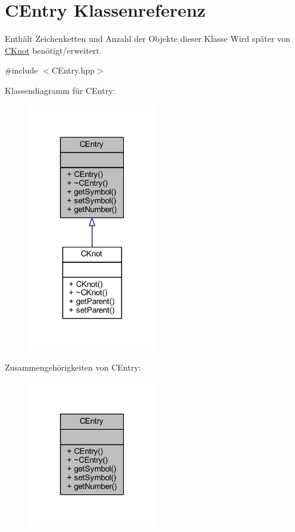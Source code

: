 \hypertarget{class_c_entry}{}\section{C\+Entry Klassenreferenz}
\label{class_c_entry}


Enthält Zeichenketten und Anzahl der Objekte dieser Klasse Wird später von \hyperlink{class_c_knot}{C\+Knot} benötigt/erweitert.  




{\ttfamily \#include $<$C\+Entry.\+hpp$>$}



Klassendiagramm für C\+Entry\+:
\nopagebreak
\begin{figure}[H]
\begin{center}
\leavevmode
\includegraphics[width=159pt]{class_c_entry__inherit__graph}
\end{center}
\end{figure}


Zusammengehörigkeiten von C\+Entry\+:
\nopagebreak
\begin{figure}[H]
\begin{center}
\leavevmode
\includegraphics[width=159pt]{class_c_entry__coll__graph}
\end{center}
\end{figure}
